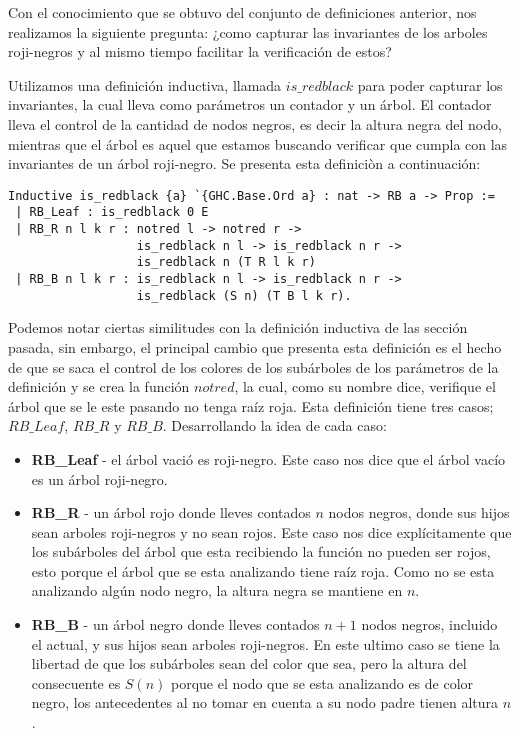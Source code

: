 \documentclass[letterpaper,12pt,oneside]{book}
\newcommand{\arn}{árbol roji-negro}
\newcommand{\arns}{arboles roji-negros}
\theoremstyle{plain}
\theoremstyle{definition}
\theoremstyle{remark}
\begin{document}
Con el conocimiento que se obtuvo del conjunto de definiciones anterior, nos realizamos la siguiente 
pregunta: ¿como capturar las invariantes de los {\arns} y al mismo tiempo facilitar la verificaci\'on de 
estos?

Utilizamos una definición inductiva, llamada $is\_redblack$ para poder capturar los invariantes, la cual
lleva como parámetros un contador y un \'arbol. El contador lleva el control de la cantidad de nodos
negros, es decir la altura negra del nodo, mientras que el \'arbol es aquel que estamos buscando
verificar que cumpla con las invariantes de un {\arn}. Se presenta esta definici\`on a continuaci\'on:

\begin{verbatim}
Inductive is_redblack {a} `{GHC.Base.Ord a} : nat -> RB a -> Prop :=
 | RB_Leaf : is_redblack 0 E
 | RB_R n l k r : notred l -> notred r ->
                  is_redblack n l -> is_redblack n r ->
                  is_redblack n (T R l k r)
 | RB_B n l k r : is_redblack n l -> is_redblack n r ->
                  is_redblack (S n) (T B l k r).
\end{verbatim}

Podemos notar ciertas similitudes con la definición inductiva de las secci\'on pasada, sin embargo, el 
principal cambio que presenta esta definición es el hecho de que se saca el control de los colores de los
subárboles de los parámetros de la definici\'on y se crea la funci\'on $notred$, la cual, como su nombre 
dice, verifique el \'arbol que se le este pasando no tenga raíz roja. Esta definici\'on tiene tres casos;
$RB\_Leaf$, $RB\_R$ y $RB\_B$. Desarrollando la idea de cada caso:

\begin{itemize}
        \item \textbf{RB\_Leaf} - el árbol vació es roji-negro. Este caso nos dice que el \'arbol vacío 
        es un {\arn}.
        \item \textbf{RB\_R} - un árbol rojo donde lleves contados $n$ nodos negros, donde sus hijos sean
        {\arns} y no sean rojos. Este caso nos dice explícitamente que los subárboles del árbol que esta 
        recibiendo la función no pueden ser rojos, esto porque el árbol que se esta analizando tiene raíz
        roja. Como no se esta analizando algún nodo negro, la altura negra se mantiene en $n$.
        \item \textbf{RB\_B} - un árbol negro donde lleves contados $n+1$ nodos negros, incluido el 
        actual, y sus hijos sean {\arns}. En este ultimo caso se tiene la libertad de que los subárboles 
        sean del color que sea, pero la altura del consecuente es $S(n)$ porque el nodo que se esta 
        analizando es de color negro, los antecedentes al no tomar en cuenta a su nodo padre tienen 
        altura $n$.
\end{itemize}
\end{document}
